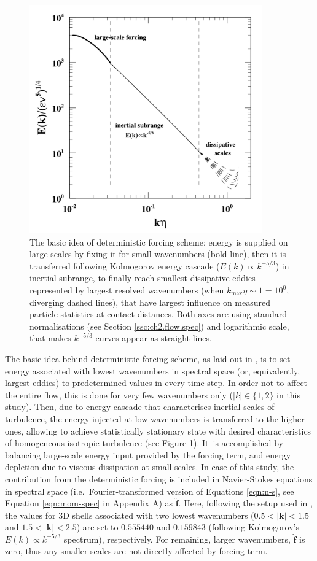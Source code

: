 \documentclass{pracamgren}
\begin{document}
\begin{figure}[h]
\centering
\includegraphics[width=10cm]{img/plots/1_1_forcing.pdf}
\caption{
The basic idea of deterministic forcing scheme: energy is supplied on large scales by fixing it for small wavenumbers (bold line), then it is transferred following Kolmogorov energy cascade ($E(k) \propto k^{-5/3}$) in inertial subrange, to finally reach smallest dissipative eddies represented by largest resolved wavenumbers (when $k_{\max} \eta \sim 1 = 10^0$, diverging dashed lines), that have largest influence on measured particle statistics at contact distances. Both axes are using standard normalisations (see Section \ref{ssc:ch2.flow.spec}) and logarithmic scale, that makes $k^{-5/3}$ curves appear as straight lines.}
\label{fig:forcing}
\end{figure}

The basic idea behind deterministic forcing scheme, as laid out in \textcite{Sullivan1994}, is to set energy associated with lowest wavenumbers in spectral space (or, equivalently, largest eddies) to predetermined values in every time step.
In order not to affect the entire flow, this is done for very few wavenumbers only ($|k| \in \{ 1, 2 \}$ in this study).
Then, due to energy cascade that characterises inertial scales of turbulence, the energy injected at low wavenumbers is transferred to the higher ones, allowing to achieve statistically stationary state with desired characteristics of homogeneous isotropic turbulence (see Figure \ref{fig:forcing}).
It~is accomplished by balancing large-scale energy input provided by the forcing term, and energy depletion due to viscous dissipation at small scales. 
In case of this study, the contribution from the deterministic forcing is included in Navier-Stokes equations in spectral space (i.e.~Fourier-transformed version of Equations \ref{eqn:n-s}, see Equation \ref{eqn:mom-spec} in Appendix A) as $\hat{\mathbf{f}}$.
Here, following the setup used in \textcite[p. 6]{Rosa2011}, the values for 3D shells associated with two lowest wavenumbers ($0.5 < |\textbf{k}| < 1.5$ and $1.5 < |\textbf{k}| < 2.5$) are set to $0.555440$ and $0.159843$ (following Kolmogorov's $E(k) \propto k^{-5/3}$ spectrum), respectively.
For remaining, larger wavenumbers, $\hat{\mathbf{f}}$ is zero, thus any smaller scales are not directly affected by forcing term.
\end{document}
